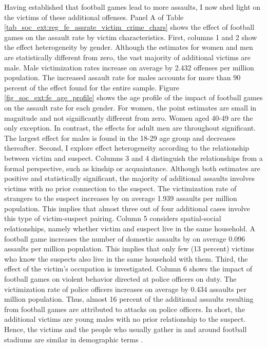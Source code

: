 Having established that football games lead to more assaults, I now shed light on the victims of these additional offenses. Panel A of Table \ref{tab_soc_ext:reg_fe_assrate_victim_crime_chars} shows the effect of football games on the assault rate by victim characteristics. First, columns 1 and 2 show the effect heterogeneity by gender. Although the estimates for women and men are statistically different from zero, the vast majority of additional victims are male. Male victimization rates increase on average by 2.432 offenses per million population. The increased assault rate for males accounts for more than 90 percent of the effect found for the entire sample. Figure \ref{fig_soc_ext:fe_age_profile} shows the age profile of the impact of football games on the assault rate for each gender. For women, the point estimates are small in magnitude and not significantly different from zero. Women aged 40-49 are the only exception. In contrast, the effects for adult men are throughout significant. The largest effect for males is found in the 18-29 age group and decreases thereafter. Second, I explore effect heterogeneity according to the relationship between victim and suspect. Columns 3 and 4 distinguish the relationships from a formal perspective, such as kinship or acquaintance. Although both estimates are positive and statistically significant, the majority of additional assaults involves victims with no prior connection to the suspect. The victimization rate of strangers to the suspect increases by on average 1.939 assaults per million population. This implies that almost three out of four additional cases involve this type of victim-suspect pairing. Column 5 considers spatial-social relationships, namely whether victim and suspect live in the same household. A football game increases the number of domestic assaults by on average 0.096 assaults per million population. This implies that only few (13 percent) victims who know the suspects also live in the same household with them. Third, the effect of the victim's occupation is investigated. Column 6 shows the impact of football games on violent behavior directed at police officers on duty. The victimization rate of police officers increases on average by 0.434 assaults per million population. Thus, almost 16 percent of the additional assaults resulting from football games are attributed to attacks on police officers. In short, the additional victims are young males with no prior relationship to the suspect. Hence, the victims and the people who usually gather in and around football stadiums are similar in demographic terms \citep{pwc2016}.

